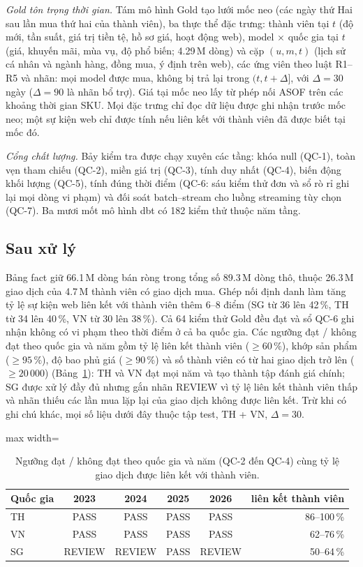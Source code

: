 \documentclass[jtehm]{ieeeaccess}
\begin{document}
\textit{Gold tôn trọng thời gian.} Tám mô hình Gold tạo lưới mốc neo (các ngày thứ Hai sau lần mua thứ hai của thành viên), ba thực thể đặc trưng: thành viên tại $t$ (độ mới, tần suất, giá trị tiền tệ, hồ sơ giá, hoạt động web), model $\times$ quốc gia tại $t$ (giá, khuyến mãi, mùa vụ, độ phổ biến; 4.29\,M dòng) và cặp $(u, m, t)$ (lịch sử cá nhân và ngành hàng, đồng mua, ý định trên web), các ứng viên theo luật R1--R5 và nhãn: mọi model được mua, không bị trả lại trong $(t, t+\Delta]$, với $\Delta = 30$ ngày ($\Delta = 90$ là nhãn bổ trợ). Giá tại mốc neo lấy từ phép nối ASOF trên các khoảng thời gian SKU. Mọi đặc trưng chỉ đọc dữ liệu được ghi nhận trước mốc neo; một sự kiện web chỉ được tính nếu liên kết với thành viên đã được biết tại mốc đó.

\textit{Cổng chất lượng.} Bảy kiểm tra được chạy xuyên các tầng: khóa null (QC-1), toàn vẹn tham chiếu (QC-2), miền giá trị (QC-3), tính duy nhất (QC-4), biến động khối lượng (QC-5), tính đúng thời điểm (QC-6: sáu kiểm thử đơn và sổ rò rỉ ghi lại mọi dòng vi phạm) và đối soát batch--stream cho luồng streaming tùy chọn (QC-7). Ba mươi mốt mô hình dbt có 182 kiểm thử thuộc năm tầng.

\subsection{Sau xử lý}
Bảng fact giữ 66.1\,M dòng bán ròng trong tổng số 89.3\,M dòng thô, thuộc 26.3\,M giao dịch của 4.7\,M thành viên có giao dịch mua. Ghép nối định danh làm tăng tỷ lệ sự kiện web liên kết với thành viên thêm 6--8 điểm (SG từ 36 lên 42\,\%, TH từ 34 lên 40\,\%, VN từ 30 lên 38\,\%). Cả 64 kiểm thử Gold đều đạt và sổ QC-6 ghi nhận không có vi phạm theo thời điểm ở cả ba quốc gia. Các ngưỡng đạt / không đạt theo quốc gia và năm gồm tỷ lệ liên kết thành viên ($\ge 60\,\%$), khớp sản phẩm ($\ge 95\,\%$), độ bao phủ giá ($\ge 90\,\%$) và số thành viên có từ hai giao dịch trở lên ($\ge 20\,000$) (Bảng~\ref{tab:gates}): TH và VN đạt mọi năm và tạo thành tập đánh giá chính; SG được xử lý đầy đủ nhưng gắn nhãn REVIEW vì tỷ lệ liên kết thành viên thấp và nhãn thiếu các lần mua lặp lại của giao dịch không được liên kết. Trừ khi có ghi chú khác, mọi số liệu dưới đây thuộc tập test, TH + VN, $\Delta = 30$.

\begin{table}[t]
\caption{Ngưỡng đạt / không đạt theo quốc gia và năm (QC-2 đến QC-4) cùng tỷ lệ giao dịch được liên kết với thành viên.}
\label{tab:gates}
\setlength{\tabcolsep}{4pt}
\centering
\begin{adjustbox}{max width=\columnwidth}
\begin{tabular}{lccccr}
\toprule
Quốc gia & 2023 & 2024 & 2025 & 2026 & liên kết thành viên \\
\midrule
TH & PASS   & PASS   & PASS & PASS   & 86--100\,\% \\
VN & PASS   & PASS   & PASS & PASS   & 62--76\,\% \\
SG & REVIEW & REVIEW & PASS & REVIEW & 50--64\,\% \\
\bottomrule
\end{tabular}
\end{adjustbox}
\end{table}
\end{document}
